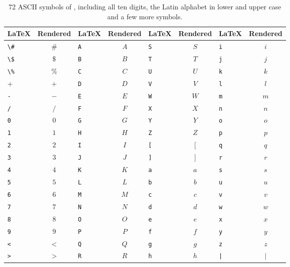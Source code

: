 \begin{table}[ht]
        \centering

            \begin{tabular}{lc|lc|lc|lc}
                \toprule
                \LaTeX & Rendered & \LaTeX & Rendered & \LaTeX & Rendered & \LaTeX & Rendered \\
                \midrule
\verb+\#+ & $\#$ &\verb+A+ & $A$ &\verb+S+ & $S$ &\verb+i+ & $i$\\
\verb+\$+ & $\$$ &\verb+B+ & $B$ &\verb+T+ & $T$ &\verb+j+ & $j$\\
\verb+\%+ & $\%$ &\verb+C+ & $C$ &\verb+U+ & $U$ &\verb+k+ & $k$\\
\verb+++ & $+$ &\verb+D+ & $D$ &\verb+V+ & $V$ &\verb+l+ & $l$\\
\verb+-+ & $-$ &\verb+E+ & $E$ &\verb+W+ & $W$ &\verb+m+ & $m$\\
\verb+/+ & $/$ &\verb+F+ & $F$ &\verb+X+ & $X$ &\verb+n+ & $n$\\
\verb+0+ & $0$ &\verb+G+ & $G$ &\verb+Y+ & $Y$ &\verb+o+ & $o$\\
\verb+1+ & $1$ &\verb+H+ & $H$ &\verb+Z+ & $Z$ &\verb+p+ & $p$\\
\verb+2+ & $2$ &\verb+I+ & $I$ &\verb+[+ & $[$ &\verb+q+ & $q$\\
\verb+3+ & $3$ &\verb+J+ & $J$ &\verb+]+ & $]$ &\verb+r+ & $r$\\
\verb+4+ & $4$ &\verb+K+ & $K$ &\verb+a+ & $a$ &\verb+s+ & $s$\\
\verb+5+ & $5$ &\verb+L+ & $L$ &\verb+b+ & $b$ &\verb+u+ & $u$\\
\verb+6+ & $6$ &\verb+M+ & $M$ &\verb+c+ & $c$ &\verb+v+ & $v$\\
\verb+7+ & $7$ &\verb+N+ & $N$ &\verb+d+ & $d$ &\verb+w+ & $w$\\
\verb+8+ & $8$ &\verb+O+ & $O$ &\verb+e+ & $e$ &\verb+x+ & $x$\\
\verb+9+ & $9$ &\verb+P+ & $P$ &\verb+f+ & $f$ &\verb+y+ & $y$\\
\verb+<+ & $<$ &\verb+Q+ & $Q$ &\verb+g+ & $g$ &\verb+z+ & $z$\\
\verb+>+ & $>$ &\verb+R+ & $R$ &\verb+h+ & $h$ &\verb+|+ & $|$\\

        \bottomrule
    \end{tabular}

    \caption{72 ASCII symbols of \dbName, including all
             ten digits, the Latin alphabet in lower and upper case and
             a few more symbols.}
    \label{table:symbols-of-db-1}
\end{table}


